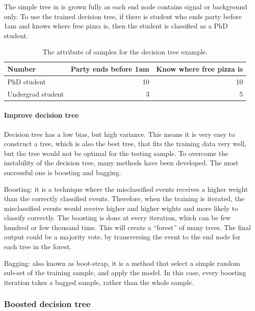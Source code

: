 The simple tree in  is grown fully as each end node contains signal or background only. To use the trained decision tree, if there is student who ends party before 1am and knows where free pizza is, then the student is classified as a PhD student.

\begin{table}[!tbp]\centering
\small
\begin{tabular}{lrr}
\hline \hline
Number & Party ends before 1am  & Know where free pizza is\\
\hline
PhD student & 10 & 10 \\
Undergrad student & 3 & 5 \\
\hline \hline
\end{tabular}
\caption
{The attribute of samples for the decision tree example.}
\label{tab:doubleHiggsDecisionTreeComic}
\end{table}

\paragraph{Improve decision tree}

Decision tree has a low bias, but high variance. This means it is very easy to construct a tree, which is also the best tree, that fits the training data very well, but the tree would not be optimal for the testing sample. To overcome the instability of the decision tree, many methods have been developed. The most successful one is boosting and bagging.

Boosting: it is a technique where the misclassified events receives a higher weight than the correctly classified events. Therefore, when the training is iterated, the misclassified events would receive higher and higher wights and more likely to classify correctly. The boosting is done at every iteration, which can be few hundred or few thousand time. This will create a ``forest'' of many trees. The final output could be a majority vote, by transversing the event to the end node for each tree in the forest.

Bagging: also known as boot-strap, it is a method that select a simple random sub-set of the training sample, and apply the model. In this case, every boosting iteration takes a bagged sample, rather than the whole sample.

\subsubsection{Boosted decision tree}
\label{sec:analysisBDT}

